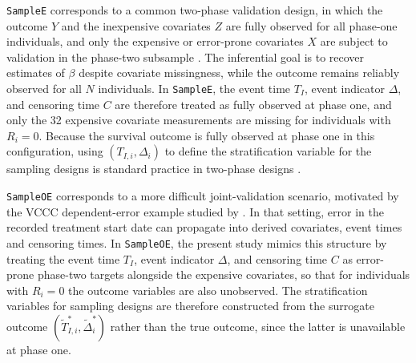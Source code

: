 \texttt{SampleE} corresponds to a common two-phase validation design, in which the outcome $Y$ and the inexpensive covariates $Z$ are fully observed for all phase-one individuals, and only the expensive or error-prone covariates $X$ are subject to validation in the phase-two subsample \citep{tao2017efficient, amorim2021two}. The inferential goal is to recover estimates of $\beta$ despite covariate missingness, while the outcome remains reliably observed for all $N$ individuals. In \texttt{SampleE}, the event time $T_I$, event indicator $\Delta$, and censoring time $C$ are therefore treated as fully observed at phase one, and only the 32 expensive covariate measurements are missing for individuals with $R_i = 0$. Because the survival outcome is fully observed at phase one in this configuration, using $(T_{I,i}, \Delta_i)$ to define the stratification variable for the sampling designs is standard practice in two-phase designs \citep{amorim2021two}.

\texttt{SampleOE} corresponds to a more difficult joint-validation scenario, motivated by the VCCC dependent-error example studied by \citet{giganti2020accounting}. In that setting, error in the recorded treatment start date can propagate into derived covariates, event times and censoring times. In \texttt{SampleOE}, the present study mimics this structure by treating the event time $T_I$, event indicator $\Delta$, and censoring time $C$ as error-prone phase-two targets alongside the expensive covariates, so that for individuals with $R_i = 0$ the outcome variables are also unobserved. The stratification variables for sampling designs are therefore constructed from the surrogate outcome $(\tilde{T}_{I,i}^*, \tilde{\Delta}_i^*)$ rather than the true outcome, since the latter is unavailable at phase one.

